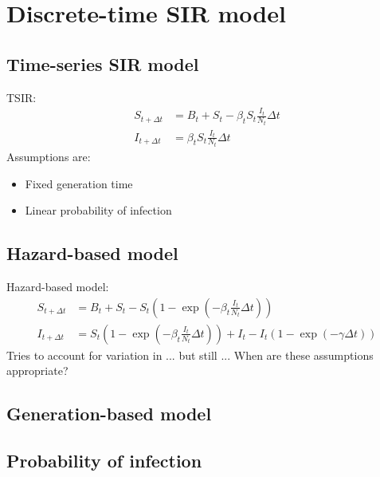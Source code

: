 \documentclass{article}
\begin{document}
\section{Discrete-time SIR model}

\subsection{Time-series SIR model}

TSIR:
\begin{equation}
\begin{aligned}
S_{t + \Delta t} &= B_t + S_t - \beta_t S_t \frac{I_t}{N_t} \Delta t\\
I_{t + \Delta t} &= \beta_t S_t \frac{I_t}{N_t} \Delta t
\end{aligned}
\end{equation}
Assumptions are:
\begin{itemize}
	\item Fixed generation time
	\item Linear probability of infection
\end{itemize}

\subsection{Hazard-based model}

Hazard-based model:
\begin{equation}
\begin{aligned}
S_{t + \Delta t} &= B_t + S_t - S_t \left(1- \exp\left(-\beta_t \frac{I_t}{N_t} \Delta t\right)\right)\\
I_{t + \Delta t} &= S_t \left( 1- \exp\left(-\beta_t \frac{I_t}{N_t} \Delta t\right)\right) + I_t - I_t (1 - \exp(-\gamma \Delta t))
\end{aligned}
\end{equation}
Tries to account for variation in ... but still ... When are these assumptions appropriate?

\subsection{Generation-based model}





\subsection{Probability of infection}
\end{document}
